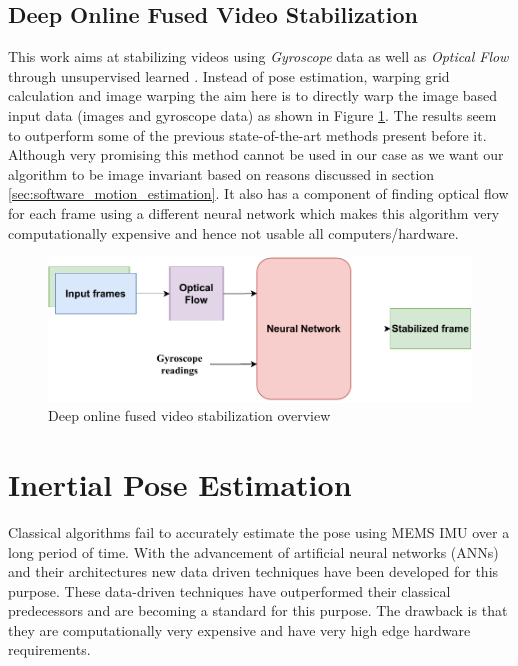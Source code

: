 \subsection{Deep Online Fused Video Stabilization}
This work aims at stabilizing videos using \textit{Gyroscope} data as well as \textit{Optical Flow} through unsupervised learned \citep{deep_opti_stab}. Instead of pose estimation, warping grid calculation and image warping the aim here is to directly warp the image based input data (images and gyroscope data) as shown in Figure \ref{fig:deep_stab}. The results seem to outperform some of the previous state-of-the-art methods present before it. Although very promising this method cannot be used in our case as we want our algorithm to be image invariant based on reasons discussed in section \ref{sec:software_motion_estimation}. It also has a component of finding optical flow for each frame using a different neural network which makes this algorithm very computationally expensive and hence not usable all computers/hardware.

\begin{figure}[H]
    \centering
    \includegraphics[scale=0.8]{images/fig_chapter3/deep_stab.pdf}
    \caption{Deep online fused video stabilization overview}
    \label{fig:deep_stab}
\end{figure}

\section{Inertial Pose Estimation}
\label{sec:sota_pose_est}
Classical algorithms fail to accurately estimate the pose using MEMS IMU over a long period of time. With the advancement of artificial neural networks (ANNs) and their architectures new data driven techniques have been developed for this purpose. These data-driven techniques have outperformed their classical predecessors and are becoming a standard for this purpose. The drawback is that they are computationally very expensive and have very high edge hardware requirements. 


